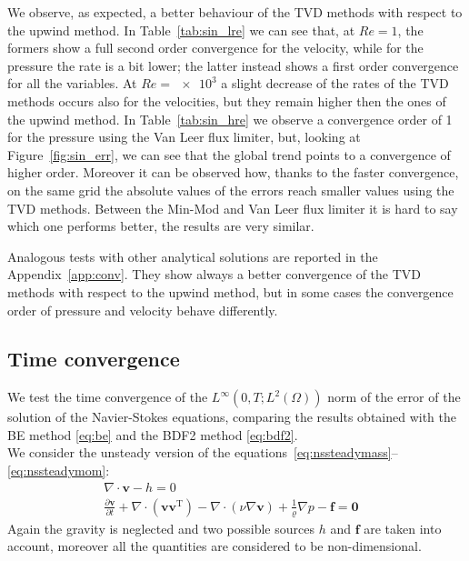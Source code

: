 We observe, as expected, a better behaviour of the TVD methods with respect to 
the upwind method. In Table~\ref{tab:sin_lre} we can see that, at $Re=1$, the 
formers show a full second order convergence for the velocity, while for the pressure the
rate is a bit lower; the latter instead shows a first order convergence for all the variables. At 
$Re=\num{e3}$ a slight decrease of the rates of the TVD methods occurs also for 
the velocities, but they remain higher then the ones of the upwind method. In 
Table~\ref{tab:sin_hre} we observe a convergence order of 1 for the pressure 
using the Van Leer flux limiter, but, looking at Figure~\ref{fig:sin_err}, we can 
see that the global trend points to a convergence of higher order. Moreover it 
can be observed how, thanks to the faster convergence, on the same grid the 
absolute values of the errors reach smaller values using the TVD methods. 
Between the Min-Mod and Van Leer flux limiter it is hard to say which one performs 
better, the results are very similar.

Analogous tests with other analytical solutions are reported in the 
Appendix~\ref{app:conv}. They show always a better convergence of the TVD 
methods with respect to the upwind method, but in some cases the convergence 
order of pressure and velocity behave differently.
%
\subsection{Time convergence}
We test the time convergence of the $L^\infty(0,T;L^2(\Omega))$ norm of the 
error of the solution of the Navier-Stokes equations, comparing the results 
obtained with the BE method \eqref{eq:be} and the BDF2 method \eqref{eq:bdf2}.\\
We consider the unsteady version of the 
equations~\eqref{eq:nssteadymass}--\eqref{eq:nssteadymom}:
\begin{align}
	\label{eq:nsunsteadymass} \nabla \cdot \mathbf{v} -h = 0&\\
	\label{eq:nsunsteadymom} \frac{\partial \mathbf{v}}{\partial t} +\nabla 
	\cdot (\mathbf{v} \mathbf{v}^\mathrm{T}) - 
	\nabla \cdot (\nu \nabla \mathbf{v}) + \frac{1}{\varrho}\nabla p  
	-\mathbf{f} = \mathbf{0}&
\end{align}
Again the gravity is neglected and two possible sources $h$ and $\mathbf{f}$ 
are taken into account, moreover all the quantities are considered to be 
non-dimensional.
%
